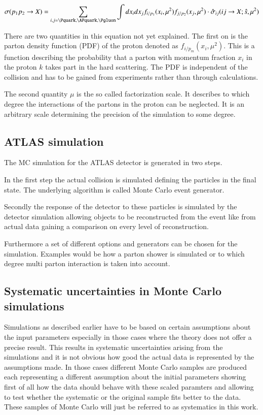 \begin{align}
	\sigma ( p_1 p_2 \rightarrow X ) = \sum_{i,j = \Pquark, \APquark, \Pgluon} \int dx_i dx_j f_{i/p_1} ( x_i, \mu^2 ) f_{j/p_2} ( x_j, \mu^2 ) \cdot \hat{\sigma}_{ij} ( ij \rightarrow X; \hat{s}, \mu^2 )
\end{align}

There are two quantities in this equation not yet explained.
The first on is the parton density function (PDF) of the proton denoted as $f_{i/p_m} ( x_i, \mu^2 )$. This is a function describing the probability that a parton with momentum fraction $x_i$ in the proton $k$ takes part in the hard scattering. The PDF is independent of the collision and has to be gained from experiments rather than through calculations.

The second quantity $\mu$ is the so called factorization scale. It describes to which degree the interactions of the partons in the proton can be neglected. It is an arbitrary scale determining the precision of the simulation to some degree.

\subsection{ATLAS simulation}

The MC simulation for the ATLAS detector is generated in two steps.~\cite{atlasmontecarlo}

In the first step the actual collision is simulated defining the particles in the final state. The underlying algorithm is called Monte Carlo event generator.

Secondly the response of the detector to these particles is simulated by the detector simulation allowing objects to be reconstructed from the event like from actual data gaining a comparison on every level of reconstruction.

Furthermore a set of different options and generators can be chosen for the simulation. Examples would be how a parton shower is simulated or to which degree multi parton interaction is taken into account.

\subsection{Systematic uncertainties in Monte Carlo simulations}

Simulations as described earlier have to be based on certain assumptions about the input parameters especially in those cases where the theory does not offer a precise result. This results in systematic uncertainties arising from the simulations and it is not obvious how good the actual data is represented by the assumptions made.
In those cases different Monte Carlo samples are produced each representing a different assumption about the initial parameters showing first of all how the data should behave with these scaled paramters and allowing to test whether the systematic or the original sample fits better to the data. 
These samples of Monte Carlo will just be referred to as systematics in this work.


